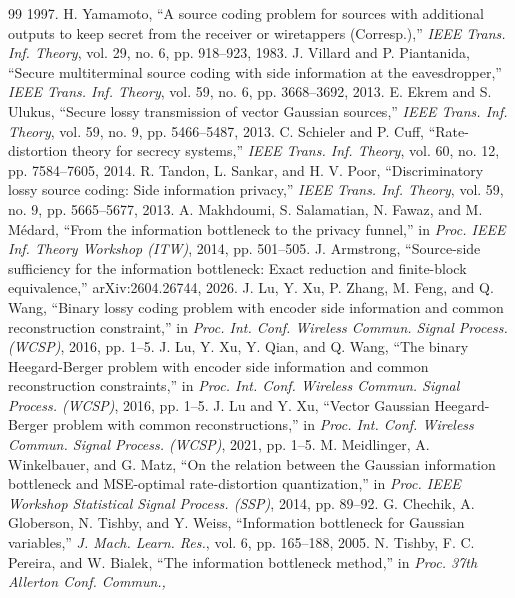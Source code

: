 \documentclass[11pt,onecolumn]{IEEEtran}
\begin{document}
\begin{thebibliography}{99}
1997.
 H. Yamamoto, ``A source coding problem for sources
with additional outputs to keep secret from the receiver or wiretappers (Corresp.),''
\emph{IEEE Trans. Inf. Theory}, vol. 29, no. 6, pp. 918--923, 1983.
 J. Villard and P. Piantanida, ``Secure multiterminal
source coding with side information at the eavesdropper,'' \emph{IEEE Trans.
Inf. Theory}, vol. 59, no. 6, pp. 3668--3692, 2013.
 E. Ekrem and S. Ulukus, ``Secure lossy transmission of
vector Gaussian sources,'' \emph{IEEE Trans. Inf. Theory}, vol. 59, no. 9,
pp. 5466--5487, 2013.
 C. Schieler and P. Cuff, ``Rate-distortion theory for
secrecy systems,'' \emph{IEEE Trans. Inf. Theory}, vol. 60, no. 12,
pp. 7584--7605, 2014.
 R. Tandon, L. Sankar, and H. V. Poor,
``Discriminatory lossy source coding: Side information privacy,''
\emph{IEEE Trans. Inf. Theory}, vol. 59, no. 9, pp. 5665--5677, 2013.
 A. Makhdoumi, S. Salamatian, N. Fawaz, and
M. M\'edard, ``From the information bottleneck to the privacy funnel,''
in \emph{Proc. IEEE Inf. Theory Workshop (ITW)}, 2014, pp. 501--505.
 J. Armstrong, ``Source-side sufficiency for the
information bottleneck: Exact reduction and finite-block equivalence,''
arXiv:2604.26744, 2026.
 J. Lu, Y. Xu, P. Zhang, M. Feng, and Q. Wang, ``Binary
lossy coding problem with encoder side information and common reconstruction
constraint,'' in \emph{Proc. Int. Conf. Wireless Commun. Signal Process.
(WCSP)}, 2016, pp. 1--5.
 J. Lu, Y. Xu, Y. Qian, and Q. Wang, ``The binary
Heegard-Berger problem with encoder side information and common reconstruction
constraints,'' in \emph{Proc. Int. Conf. Wireless Commun. Signal Process.
(WCSP)}, 2016, pp. 1--5.
 J. Lu and Y. Xu, ``Vector Gaussian Heegard-Berger problem
with common reconstructions,'' in \emph{Proc. Int. Conf. Wireless Commun. Signal
Process. (WCSP)}, 2021, pp. 1--5.
 M. Meidlinger, A. Winkelbauer, and G. Matz, ``On the
relation between the Gaussian information bottleneck and MSE-optimal
rate-distortion quantization,'' in \emph{Proc. IEEE Workshop Statistical Signal
Process. (SSP)}, 2014, pp. 89--92.
 G. Chechik, A. Globerson, N. Tishby, and Y. Weiss,
``Information bottleneck for Gaussian variables,'' \emph{J. Mach. Learn.
Res.}, vol. 6, pp. 165--188, 2005.
 N. Tishby, F. C. Pereira, and W. Bialek, ``The
information bottleneck method,'' in \emph{Proc. 37th Allerton Conf. Commun.,
}
\end{thebibliography}
\end{document}
